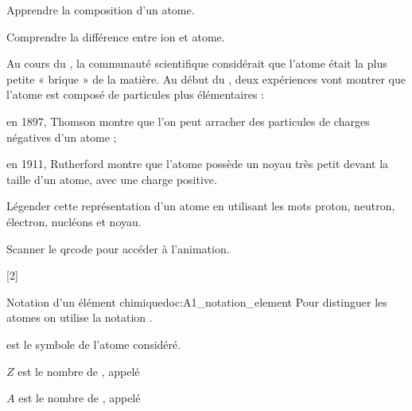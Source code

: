 \teteSndAtom



\begin{objectifs}
  \item Apprendre la composition d'un atome.
  \item Comprendre la différence entre ion et atome.
\end{objectifs}

\begin{contexte}
  Au cours du , la communauté scientifique considérait que l'atome était la plus petite « brique  » de la matière.
  Au début du , deux expériences vont montrer que l'atome est composé de particules plus élémentaires :
  \begin{listePoints}
    \item en 1897, Thomson montre que l'on peut arracher des particules de charges négatives d'un atome ;
    \item en 1911, Rutherford montre que l'atome possède un noyau très petit devant la taille d'un atome, avec une charge positive.
  \end{listePoints}
  
\end{contexte}



\numeroQuestion
Légender cette représentation d'un atome en utilisant les mots proton, neutron, électron, nucléons et noyau.

\begin{center}
\end{center}


\mesure Scanner le qrcode pour accéder à l'animation.

[2]

\begin{doc}{Notation d'un élément chimique}{doc:A1_notation_element}
  Pour distinguer les atomes on utilise la notation .
  \begin{importants}
    \begin{listePoints}
      \item {} est le symbole de l'atome considéré.
      \item $Z$ est le nombre de , appelé 
      \item $A$ est le nombre de , appelé 
    \end{listePoints}
  \end{importants}
\end{doc}

